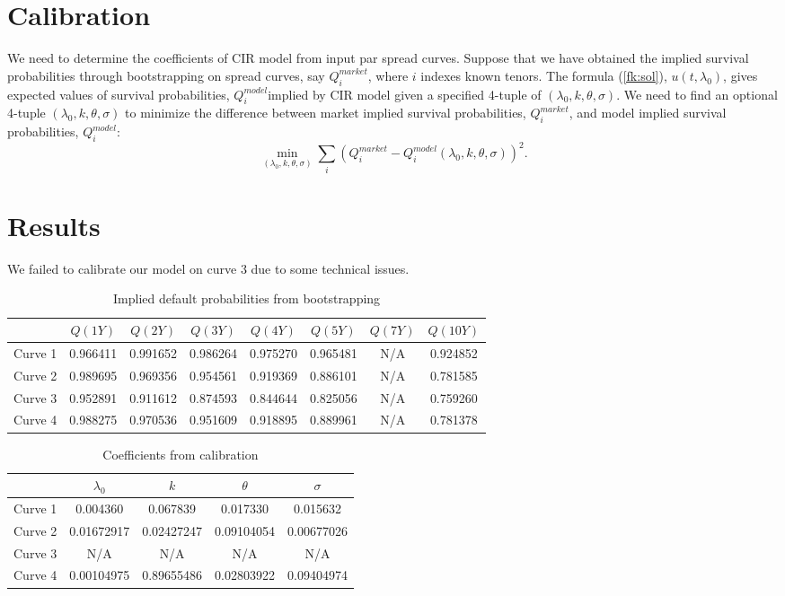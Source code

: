 \documentclass[a4paper,twoside,10pt]{report}
\begin{document}
\chapter{Calibration}
We need to determine the coefficients of CIR model from input par spread curves. Suppose that we have obtained the implied survival probabilities through bootstrapping on spread curves, say $Q^{market}_i$, where $i$ indexes known tenors. The formula (\ref{fk:sol}), $u(t, \lambda_0)$,  gives expected values of survival probabilities, $Q^{model}_i$implied by CIR model given a specified 4-tuple of $(\lambda_0, k, \theta, \sigma)$. We need to find an optional 4-tuple $(\lambda_0, k, \theta, \sigma)$ to minimize the difference between market implied survival probabilities, $Q^{market}_i$, and model implied survival probabilities, $Q^{model}_i$:
\begin{equation}
\min_{(\lambda_0, k, \theta, \sigma)} \sum_i (Q^{market}_i - Q^{model}_i(\lambda_0, k, \theta, \sigma))^2.
\end{equation}

\chapter{Results}
We failed to calibrate our model on curve 3 due to some technical issues.

\begin{table}[h!]
\centering
\begin{tabular}{ |c|c|c|c|c|c|c|c| } 
 \hline
					 & $Q(1Y)$ & $Q(2Y)$ & $Q(3Y)$ & $Q(4Y)$ & $Q(5Y)$ & $Q(7Y)$ & $Q(10Y)$ \\ 
 \hline
	Curve 1  & 0.966411 & 0.991652 & 0.986264 & 0.975270 & 0.965481 & N/A & 0.924852 \\ 
 \hline
  Curve 2  & 0.989695 & 0.969356 & 0.954561 & 0.919369 & 0.886101 & N/A & 0.781585 \\ 
 \hline
	Curve 3  & 0.952891 & 0.911612 & 0.874593 & 0.844644 & 0.825056 & N/A & 0.759260 \\ 
 \hline
	Curve 4  & 0.988275 & 0.970536 & 0.951609 & 0.918895 & 0.889961 & N/A & 0.781378 \\ 
 \hline
\end{tabular}
\caption{Implied default probabilities from bootstrapping}
\label{implied_Q}
\end{table}

\begin{table}[h!]
\centering
\begin{tabular}{ |c|c|c|c|c| } 
 \hline
					 & $\lambda_0$ & $k$ & $\theta$ & $\sigma$  \\ 
 \hline
	Curve 1  & 0.004360 & 0.067839 & 0.017330 & 0.015632\\ 
 \hline
  Curve 2  & 0.01672917 & 0.02427247 & 0.09104054 & 0.00677026 \\ 
 \hline
	Curve 3  & N/A & N/A & N/A & N/A \\ 
 \hline
	Curve 4  & 0.00104975 & 0.89655486 & 0.02803922 & 0.09404974 \\ 
 \hline
\end{tabular}
\caption{Coefficients from calibration}
\label{calibration}
\end{table}
\end{document}

